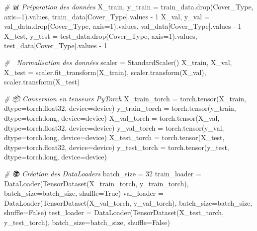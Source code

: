 \documentclass[
  letterpaper,
  DIV=11,
  numbers=noendperiod]{scrartcl}
\newenvironment{Shaded}{}{}
\newcommand{\BuiltInTok}[1]{\textcolor[rgb]{0.00,0.50,0.00}{#1}}
\newcommand{\CommentTok}[1]{\textcolor[rgb]{0.38,0.63,0.69}{\textit{#1}}}
\newcommand{\DecValTok}[1]{\textcolor[rgb]{0.25,0.63,0.44}{#1}}
\newcommand{\NormalTok}[1]{#1}
\newcommand{\OperatorTok}[1]{\textcolor[rgb]{0.40,0.40,0.40}{#1}}
\newcommand{\StringTok}[1]{\textcolor[rgb]{0.25,0.44,0.63}{#1}}
\newcommand{\VariableTok}[1]{\textcolor[rgb]{0.10,0.09,0.49}{#1}}
\begin{document}
\begin{Shaded}
\begin{Highlighting}[]
\CommentTok{\# 📊 Préparation des données}
\NormalTok{X\_train, y\_train }\OperatorTok{=}\NormalTok{ train\_data.drop(}\StringTok{\textquotesingle{}Cover\_Type\textquotesingle{}}\NormalTok{, axis}\OperatorTok{=}\DecValTok{1}\NormalTok{).values, train\_data[}\StringTok{\textquotesingle{}Cover\_Type\textquotesingle{}}\NormalTok{].values }\OperatorTok{{-}} \DecValTok{1}
\NormalTok{X\_val, y\_val }\OperatorTok{=}\NormalTok{ val\_data.drop(}\StringTok{\textquotesingle{}Cover\_Type\textquotesingle{}}\NormalTok{, axis}\OperatorTok{=}\DecValTok{1}\NormalTok{).values, val\_data[}\StringTok{\textquotesingle{}Cover\_Type\textquotesingle{}}\NormalTok{].values }\OperatorTok{{-}} \DecValTok{1}
\NormalTok{X\_test, y\_test }\OperatorTok{=}\NormalTok{ test\_data.drop(}\StringTok{\textquotesingle{}Cover\_Type\textquotesingle{}}\NormalTok{, axis}\OperatorTok{=}\DecValTok{1}\NormalTok{).values, test\_data[}\StringTok{\textquotesingle{}Cover\_Type\textquotesingle{}}\NormalTok{].values }\OperatorTok{{-}} \DecValTok{1}

\CommentTok{\# 🔢 Normalisation des données}
\NormalTok{scaler }\OperatorTok{=}\NormalTok{ StandardScaler()}
\NormalTok{X\_train, X\_val, X\_test }\OperatorTok{=}\NormalTok{ scaler.fit\_transform(X\_train), scaler.transform(X\_val), scaler.transform(X\_test)}

\CommentTok{\# 📦 Conversion en tenseurs PyTorch}
\NormalTok{X\_train\_torch }\OperatorTok{=}\NormalTok{ torch.tensor(X\_train, dtype}\OperatorTok{=}\NormalTok{torch.float32, device}\OperatorTok{=}\NormalTok{device)}
\NormalTok{y\_train\_torch }\OperatorTok{=}\NormalTok{ torch.tensor(y\_train, dtype}\OperatorTok{=}\NormalTok{torch.}\BuiltInTok{long}\NormalTok{, device}\OperatorTok{=}\NormalTok{device)}
\NormalTok{X\_val\_torch }\OperatorTok{=}\NormalTok{ torch.tensor(X\_val, dtype}\OperatorTok{=}\NormalTok{torch.float32, device}\OperatorTok{=}\NormalTok{device)}
\NormalTok{y\_val\_torch }\OperatorTok{=}\NormalTok{ torch.tensor(y\_val, dtype}\OperatorTok{=}\NormalTok{torch.}\BuiltInTok{long}\NormalTok{, device}\OperatorTok{=}\NormalTok{device)}
\NormalTok{X\_test\_torch }\OperatorTok{=}\NormalTok{ torch.tensor(X\_test, dtype}\OperatorTok{=}\NormalTok{torch.float32, device}\OperatorTok{=}\NormalTok{device)}
\NormalTok{y\_test\_torch }\OperatorTok{=}\NormalTok{ torch.tensor(y\_test, dtype}\OperatorTok{=}\NormalTok{torch.}\BuiltInTok{long}\NormalTok{, device}\OperatorTok{=}\NormalTok{device)}

\CommentTok{\# 📚 Création des DataLoaders}
\NormalTok{batch\_size }\OperatorTok{=} \DecValTok{32}
\NormalTok{train\_loader }\OperatorTok{=}\NormalTok{ DataLoader(TensorDataset(X\_train\_torch, y\_train\_torch), batch\_size}\OperatorTok{=}\NormalTok{batch\_size, shuffle}\OperatorTok{=}\VariableTok{True}\NormalTok{)}
\NormalTok{val\_loader }\OperatorTok{=}\NormalTok{ DataLoader(TensorDataset(X\_val\_torch, y\_val\_torch), batch\_size}\OperatorTok{=}\NormalTok{batch\_size, shuffle}\OperatorTok{=}\VariableTok{False}\NormalTok{)}
\NormalTok{test\_loader }\OperatorTok{=}\NormalTok{ DataLoader(TensorDataset(X\_test\_torch, y\_test\_torch), batch\_size}\OperatorTok{=}\NormalTok{batch\_size, shuffle}\OperatorTok{=}\VariableTok{False}\NormalTok{)}


\end{Highlighting}
\end{Shaded}
\end{document}

